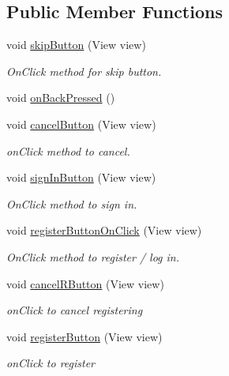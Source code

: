\subsection*{Public Member Functions}
\begin{DoxyCompactItemize}
\item 
void \hyperlink{classuk_1_1ac_1_1swan_1_1digitaltrails_1_1activities_1_1_launch_activity_a6d79859c68f2c1db35d659c9198ea1ae}{skip\+Button} (View view)
\begin{DoxyCompactList}\small\item\em On\+Click method for skip button. \end{DoxyCompactList}\item 
void \hyperlink{classuk_1_1ac_1_1swan_1_1digitaltrails_1_1activities_1_1_launch_activity_ad3c5c2eec03711a8d59567e708064ea9}{on\+Back\+Pressed} ()
\item 
void \hyperlink{classuk_1_1ac_1_1swan_1_1digitaltrails_1_1activities_1_1_launch_activity_a10e20eef1550ea5c8ffa370fdd920ea4}{cancel\+Button} (View view)
\begin{DoxyCompactList}\small\item\em on\+Click method to cancel. \end{DoxyCompactList}\item 
void \hyperlink{classuk_1_1ac_1_1swan_1_1digitaltrails_1_1activities_1_1_launch_activity_af53e2ce9b4e7d85a5cfa6ad40338b251}{sign\+In\+Button} (View view)
\begin{DoxyCompactList}\small\item\em On\+Click method to sign in. \end{DoxyCompactList}\item 
void \hyperlink{classuk_1_1ac_1_1swan_1_1digitaltrails_1_1activities_1_1_launch_activity_a2f01df12f126e5abe0461d204e647034}{register\+Button\+On\+Click} (View view)
\begin{DoxyCompactList}\small\item\em On\+Click method to register / log in. \end{DoxyCompactList}\item 
void \hyperlink{classuk_1_1ac_1_1swan_1_1digitaltrails_1_1activities_1_1_launch_activity_adab4e7f0527bef7828c4128c9cde914e}{cancel\+R\+Button} (View view)
\begin{DoxyCompactList}\small\item\em on\+Click to cancel registering \end{DoxyCompactList}\item 
void \hyperlink{classuk_1_1ac_1_1swan_1_1digitaltrails_1_1activities_1_1_launch_activity_a431ad1ad4b94a81e0ea680c4da542992}{register\+Button} (View view)
\begin{DoxyCompactList}\small\item\em on\+Click to register \end{DoxyCompactList}\end{DoxyCompactItemize}
